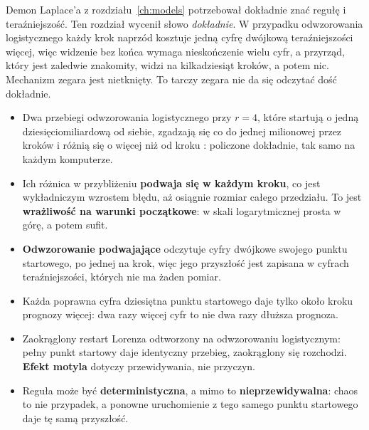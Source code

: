 \noindent
Demon Laplace'a z rozdziału~\ref{ch:models} potrzebował dokładnie znać
regułę i teraźniejszość. Ten rozdział wycenił słowo \emph{dokładnie}. W
przypadku odwzorowania logistycznego każdy krok naprzód kosztuje jedną cyfrę
dwójkową teraźniejszości więcej, więc widzenie bez końca wymaga
nieskończenie wielu cyfr, a przyrząd, który jest zaledwie znakomity, widzi
na kilkadziesiąt kroków, a potem nic. Mechanizm zegara jest nietknięty. To
tarczy zegara nie da się odczytać dość dokładnie.

\begin{summarybox}
\begin{itemize}
\item Dwa przebiegi odwzorowania logistycznego przy $r = 4$, które startują
  o jedną dziesięciomiliardową od siebie, zgadzają się co do jednej
  milionowej przez  kroków i różnią się o więcej niż
   od kroku : policzone dokładnie, tak
  samo na każdym komputerze.
\item Ich różnica w przybliżeniu \textbf{podwaja się w każdym kroku}, co
  jest wykładniczym wzrostem błędu, aż osiągnie rozmiar całego przedziału. To
  jest \textbf{wrażliwość na warunki początkowe}: w skali logarytmicznej
  prosta w górę, a potem sufit.
\item \textbf{Odwzorowanie podwajające} odczytuje cyfry dwójkowe swojego
  punktu startowego, po jednej na krok, więc jego przyszłość jest zapisana w
  cyfrach teraźniejszości, których nie ma żaden pomiar.
\item Każda poprawna cyfra dziesiętna punktu startowego daje tylko około
   kroku prognozy więcej: dwa razy więcej cyfr to nie
  dwa razy dłuższa prognoza.
\item Zaokrąglony restart Lorenza odtworzony na odwzorowaniu logistycznym:
  pełny punkt startowy daje identyczny przebieg, zaokrąglony się rozchodzi.
  \textbf{Efekt motyla} dotyczy przewidywania, nie przyczyn.
\item Reguła może być \textbf{deterministyczna}, a mimo to
  \textbf{nieprzewidywalna}: chaos to nie przypadek, a ponowne uruchomienie z
  tego samego punktu startowego daje tę samą przyszłość.
\end{itemize}
\end{summarybox}

\canyou

